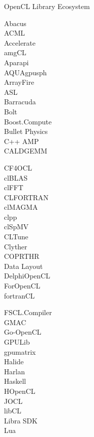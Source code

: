 
\begin{frame}{OpenCL Library Ecosystem}

 \begin{minipage}{0.19\textwidth}
Abacus\\
ACML\\
Accelerate\\
amgCL\\
Aparapi\\
AQUAgpusph\\
ArrayFire\\
ASL\\
Barracuda\\
Bolt\\
Boost.Compute\\
Bullet Physics\\
C++ AMP\\
CALDGEMM\\
 \end{minipage}
 \begin{minipage}{0.19\textwidth}
CF4OCL\\
clBLAS\\
clFFT\\
CLFORTRAN\\
clMAGMA\\
clpp\\
clSpMV\\
CLTune\\
Clyther\\
COPRTHR\\
Data Layout\\
DelphiOpenCL\\
ForOpenCL\\
fortranCL\\
 \end{minipage}
  \begin{minipage}{0.2\textwidth}
FSCL.Compiler\\
GMAC\\
Go-OpenCL\\
GPULib\\
gpumatrix\\
Halide\\
Harlan\\
Haskell\\
HOpenCL\\
JOCL\\
libCL\\
Libra SDK\\
Lua\\

\end{minipage}
\end{frame}
